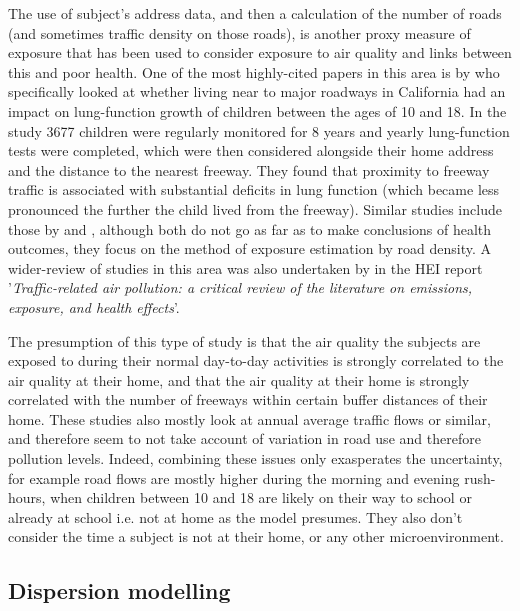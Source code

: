 The use of subject's address data, and then a calculation of the number of roads (and sometimes traffic density on those roads), is another proxy measure of exposure that has been used to consider exposure to air quality and links between this and poor health. One of the most highly-cited papers in this area is by \cite{Gauderman2007}  who specifically looked at whether living near to major roadways in California had an impact on lung-function growth of children between the ages of 10 and 18. In the study 3677 children were regularly monitored for 8 years and yearly lung-function tests were completed, which were then considered alongside their home address and the distance to the nearest freeway. They found that proximity to freeway traffic is associated with substantial deficits in lung function (which became less pronounced the further the child lived from the freeway). Similar studies include those by \cite{Janssen2001} and \cite{Rose2009}, although both do not go as far as to make conclusions of health outcomes, they focus on the method of exposure estimation by road density. A wider-review of studies in this area was also undertaken by \cite{HPotHEoT-RA2010} in the HEI report '\textit{Traffic-related air pollution: a critical review of the literature on emissions, exposure, and health effects}'.

The presumption of this type of study is that the air quality the subjects  are exposed to during their normal day-to-day activities is strongly correlated to the air quality at their home, and that the air quality at their home is strongly correlated with the number of freeways within certain buffer distances of their home. These studies also mostly look at annual average traffic flows or similar, and therefore seem to not take account of variation in road use and therefore pollution levels. Indeed, combining these issues only exasperates the uncertainty, for example road flows are mostly higher during the morning and evening rush-hours, when children between 10 and 18 are likely on their way to school or already at school i.e. not at home as the model presumes. They also don't consider the time a subject is not at their home, or any other microenvironment. 


\subsection{Dispersion modelling}
\label{subsec:dispersionmodelling}

